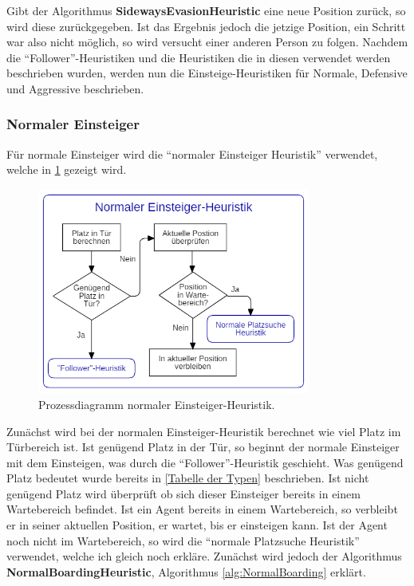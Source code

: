 Gibt der Algorithmus \textbf{SidewaysEvasionHeuristic} eine neue Position zurück, so wird diese zurückgegeben. Ist das Ergebnis jedoch die jetzige Position, ein Schritt war also nicht möglich, so wird versucht einer anderen Person zu folgen.
Nachdem die "`Follower"'-Heuristiken und die Heuristiken die in diesen verwendet werden beschrieben wurden, werden nun die Einsteige-Heuristiken für Normale, Defensive und Aggressive beschrieben.

\subsubsection{Normaler Einsteiger} 
Für normale Einsteiger wird die "`normaler Einsteiger Heuristik"' verwendet, welche in \figurename \ref{fig:NEH} gezeigt wird.
\begin{figure}[H]
	\centering
		\includegraphics[width=0.8\textwidth]{pictures/model/algorithm/boarding/normal_boarding/normal_boarding_heuristic.png}
	\caption{Prozessdiagramm normaler Einsteiger-Heuristik.}
	\label{fig:NEH}
\end{figure}
Zunächst wird bei der normalen Einsteiger-Heuristik berechnet wie viel Platz im Türbereich ist. Ist genügend Platz in der Tür, so beginnt der normale Einsteiger mit dem Einsteigen, was durch die "`Follower"'-Heuristik geschieht. Was genügend Platz bedeutet wurde bereits in \ref{Tabelle der Typen} beschrieben. Ist nicht genügend Platz wird überprüft ob sich dieser Einsteiger bereits in einem Wartebereich befindet. Ist ein Agent bereits in einem Wartebereich, so verbleibt er in seiner aktuellen Position, er wartet, bis er einsteigen kann. Ist der Agent noch nicht im Wartebereich, so wird die "`normale Platzsuche Heuristik"' verwendet, welche ich gleich noch erkläre. Zunächst wird jedoch der Algorithmus \textbf{NormalBoardingHeuristic}, Algorithmus \ref{alg:NormalBoarding} erklärt. 

